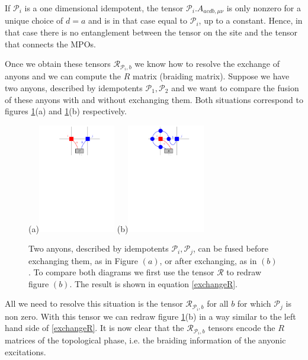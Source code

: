 \documentclass[12 pt]{article}
\begin{document}
If $\mathcal{P}_i$ is a one dimensional idempotent, the tensor $\mathcal{P}_i.A_{acdb,\mu\nu}$ is only nonzero for a unique choice of $d=a$ and is in that case equal to $\mathcal{P}_i$, up to a constant. Hence, in that case there is no entanglement between the tensor on the site and the tensor that connects the MPOs. 

Once we obtain these tensors $\mathcal{R}_{\mathcal{P}_i,b}$ we know how to resolve the exchange of anyons and we can compute the $R$ matrix (braiding matrix). Suppose we have two anyons, described by idempotents $\mathcal{P}_1, \mathcal{P}_2$ and we want to compare the fusion of these anyons with and without exchanging them. Both situations correspond to figures \ref{fig:exchange}(a) and \ref{fig:exchange}(b) respectively.

\begin{figure}[H]
  \centering
    (a)\includegraphics[width=0.3\textwidth]{FusionWithoutBraiding.pdf}
    (b)\includegraphics[width=0.3\textwidth]{FusionWithBraiding.pdf}
   \caption{Two anyons, described by idempotents $\mathcal{P}_i,\mathcal{P}_j$, can be fused before exchanging them, as in Figure $(a)$, or after exchanging, as in $(b)$. To compare both diagrams we first use the tensor $\mathcal{R}$ to redraw figure $(b)$. The result is shown in equation \eqref{exchangeR}.}
\label{fig:exchange}
\end{figure}

All we need to resolve this situation is the tensor $\mathcal{R}_{\mathcal{P}_i,b}$ for all $b$ for which $\mathcal{P}_j$ is non zero. With this tensor we can redraw figure \ref{fig:exchange}(b) in a way similar to the left hand side of \eqref{exchangeR}. It is now clear that the $\mathcal{R}_{\mathcal{P}_i,b}$ tensors encode the $R$ matrices of the topological phase, i.e. the braiding information of the anyonic excitations.
\end{document}
